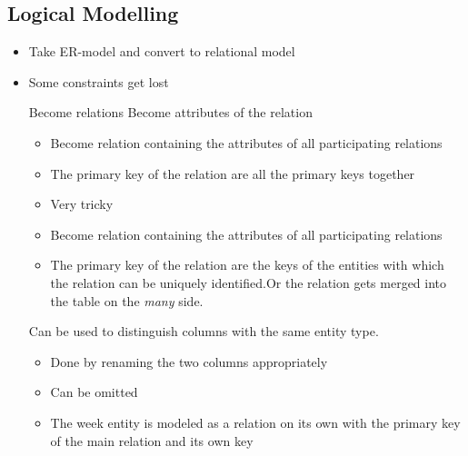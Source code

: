 \subsection{Logical Modelling}
\begin{itemize}
    \item Take ER-model and convert to relational model
    \item Some constraints get lost
        \begin{enumerate}
             Become relations
             Become attributes of the relation
                \begin{itemize}
                        \begin{itemize}
                            \item Become relation containing the attributes of all participating relations
                            \item The primary key of the relation are all the primary keys together
                        \end{itemize}
                        \begin{itemize}
                            \item Very tricky
                            \item Become relation containing the attributes of all participating relations
                            \item The primary key of the relation are the keys of the entities with which the relation can be uniquely identified.Or the relation gets merged into the table on the \textit{many} side.
                        \end{itemize}
                     Can be used to distinguish columns with the same entity type.
                        \begin{itemize}
                            \item Done by renaming the two columns appropriately
                        \end{itemize}
                \end{itemize}
                \begin{itemize}
                    \item Can be omitted
                    \item The week entity is modeled as a relation on its own with the primary key of the main relation and its own key

\end{itemize}
\end{enumerate}
\end{itemize}
